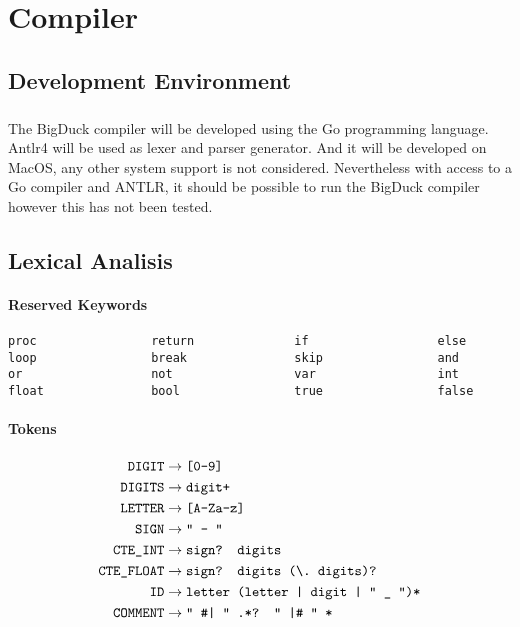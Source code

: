 
\chapter{Compiler}

\section{Development Environment}

\paragraph{} The BigDuck compiler will be developed using the Go programming
language. Antlr4 will be used as lexer and parser generator. And it will be
developed on MacOS, any other system support is not considered. Nevertheless
with access to a Go compiler and ANTLR, it should be possible to run the
BigDuck compiler however this has not been tested.

\section{Lexical Analisis}

\subsubsection{Reserved Keywords}
\begin{verbatim}
proc                return              if                  else
loop                break               skip                and
or                  not                 var                 int
float               bool                true                false
\end{verbatim}

\subsubsection{Tokens}
\begin{align*}
	\texttt{DIGIT}
	&\rightarrow\texttt{[0-9]}\\
	\texttt{DIGITS}
	&\rightarrow\texttt{digit+}\\
	\texttt{LETTER}
	&\rightarrow\texttt{[A-Za-z]}\\
	\texttt{SIGN}
	&\rightarrow\texttt{`` - ''}\\
	\texttt{CTE\_INT}
	&\rightarrow\texttt{sign? digits}\\
	\texttt{CTE\_FLOAT}
	&\rightarrow\texttt{sign? digits (\textbackslash.\ digits)?}\\
	\texttt{ID}
	&\rightarrow\texttt{letter (letter | digit | `` \_ '')*}\\
	\texttt{COMMENT}
	&\rightarrow\texttt{`` \#| '' \phantom{}.*? `` |\# '' *}\\
\end{align*}

